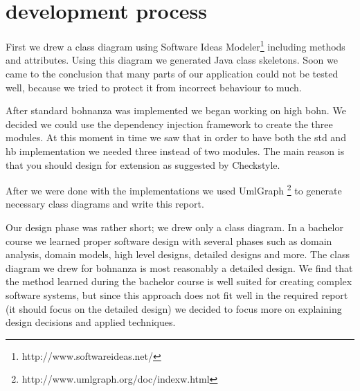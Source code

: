 \section{development process}
First we drew a class diagram using Software Ideas Modeler\footnote{http://www.softwareideas.net/} including methods and attributes. Using
this diagram we generated Java class skeletons. Soon we came to the conclusion that many parts of our application could not be
tested well, because we tried to protect it from incorrect behaviour to much. 


After standard bohnanza was implemented we began working on high bohn. We decided we could use the dependency injection framework to create
the three modules. At this moment in time we saw that in order to have both the \gls{std} and \gls{hb} implementation we needed three
instead of two modules. The main reason is that you should design for extension as suggested by Checkstyle. 

After we were done with the implementations we used
UmlGraph \footnote{http://www.umlgraph.org/doc/indexw.html} to generate necessary class diagrams and write this report. 

Our design phase was rather short; we drew only a class diagram. In a bachelor course we learned proper software design with several phases
such as domain analysis, domain models, high level designs, detailed designs and more. The class diagram we drew for bohnanza is most
reasonably a detailed design. We find that the method learned during the bachelor course is well suited for creating complex software systems,
but since this approach does not fit well in the required report (it should focus on the detailed design) we decided to focus more on
explaining design decisions and applied techniques.
